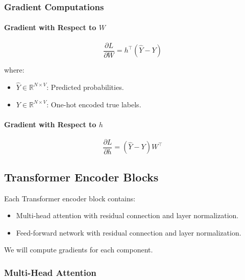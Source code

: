 \documentclass{article}
\begin{document}
\subsubsection{Gradient Computations}

\paragraph{Gradient with Respect to $W$}

\begin{equation}
    \frac{\partial L}{\partial W} = h^\top \left( \hat{Y} - Y \right)
\end{equation}

where:

\begin{itemize}
    \item $\hat{Y} \in \mathbb{R}^{N \times V}$: Predicted probabilities.
    \item $Y \in \mathbb{R}^{N \times V}$: One-hot encoded true labels.
\end{itemize}

\paragraph{Gradient with Respect to $h$}

\begin{equation}
    \frac{\partial L}{\partial h} = \left( \hat{Y} - Y \right) W^\top
\end{equation}

\subsection{Transformer Encoder Blocks}

Each Transformer encoder block contains:

\begin{itemize}
    \item Multi-head attention with residual connection and layer normalization.
    \item Feed-forward network with residual connection and layer normalization.
\end{itemize}

We will compute gradients for each component.

\subsubsection{Multi-Head Attention}
\end{document}
